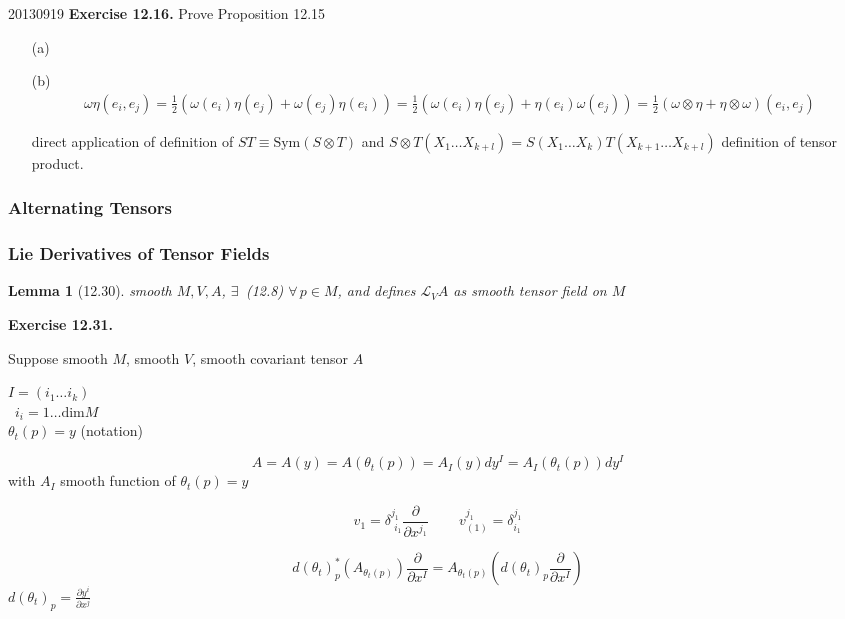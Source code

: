 \documentclass[11pt]{amsart}
\newtheorem{lemma}{Lemma}
\theoremstyle{definition}
\newcommand{\exercisehead}[1]{\medskip\noindent\textbf{Exercise #1.} }
\begin{document}
20130919
\exercisehead{12.16} Prove Proposition 12.15

\begin{enumerate}
\item[(a)]
\item[(b)] \[
\begin{gathered}
  \omega \eta(e_i, e_j) = \frac{1}{2} ( \omega(e_i) \eta(e_j) + \omega(e_j) \eta(e_i)  ) = \frac{1}{2} ( \omega(e_i) \eta(e_j) + \eta(e_i) \omega(e_j)) = \frac{1}{2} ( \omega \otimes \eta + \eta \otimes \omega)(e_i ,e_j)
\end{gathered}
\]

direct application of definition of $ST \equiv \text{Sym}{(S\otimes T)}$ and $S\otimes T(X_1 \dots X_{k+l} ) = S(X_1 \dots X_k) T(X_{k+1} \dots X_{k+l})$ definition of tensor product.

\end{enumerate}

\subsubsection*{Alternating Tensors}





\subsubsection*{Lie Derivatives of Tensor Fields}



\begin{lemma}[12.30] smooth $M,V,A$, $\exists \, $ (12.8) $\forall \, p \in M$, and defines $\mathcal{L}_VA$ as smooth tensor field on $M$
\end{lemma}

\exercisehead{12.31}

Suppose smooth $M$, smooth $V$, smooth covariant tensor $A$

$I = (i_1 \dots i_k)$ \\
\quad \, $i_i = 1 \dots \text{dim}{M}$ \\

$\theta_t(p) = y$ (notation)

\[
A = A(y) = A(\theta_t(p)) = A_I(y) dy^I = A_I(\theta_t(p)) dy^I
\]
with $A_I$ smooth function of $\theta_t(p) = y$


\[
v_1 = \delta^{j_1}_{ \, \, i_1} \frac{ \partial }{ \partial x^{j_1}} \quad \quad \, v^{j_1}_{ (1)} = \delta^{j_1}_{ i_1}
\]


\[
d(\theta_t)^*_p(A_{\theta_t(p)}) \frac{ \partial }{ \partial x^I} = A_{\theta_t(p)}(d(\theta_t)_p \frac{ \partial }{ \partial x^I } )
\]
$d(\theta_t)_p = \frac{ \partial y^i}{ \partial x^j}$
\end{document}
